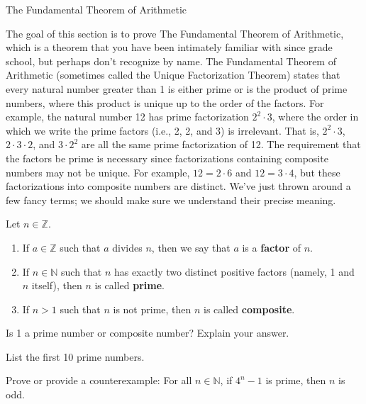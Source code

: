 \begin{section}{The Fundamental Theorem of Arithmetic}

The goal of this section is to prove The Fundamental Theorem of Arithmetic, which is a theorem that you have been intimately familiar with since grade school, but perhaps don't recognize by name.  The Fundamental Theorem of Arithmetic (sometimes called the Unique Factorization Theorem) states that every natural number greater than 1 is either prime or is the product of prime numbers, where this product is unique up to the order of the factors. For example, the natural number 12 has prime factorization $2^2\cdot 3$, where the order in which we write the prime factors (i.e., 2, 2, and 3) is irrelevant. That is, $2^2\cdot 3$, $2\cdot 3\cdot2$, and $3\cdot 2^2$ are all the same prime factorization of 12. The requirement that the factors be prime is necessary since factorizations containing composite numbers may not be unique. For example, $12=2\cdot 6$ and $12=3\cdot 4$, but these factorizations into composite numbers are distinct. We've just thrown around a few fancy terms; we should make sure we understand their precise meaning.

\begin{definition}
Let $n\in\mathbb{Z}$.
\begin{enumerate}[label=\textrm{(\alph*)}]
\item If $a\in \mathbb{Z}$ such that $a$ divides $n$, then we say that $a$ is a \textbf{factor} of $n$.
\item If $n\in \mathbb{N}$ such that $n$ has exactly two distinct positive factors (namely, 1 and $n$ itself), then $n$ is called \textbf{prime}.
\item If $n>1$ such that $n$ is not prime, then $n$ is called \textbf{composite}.
\end{enumerate}
\end{definition}

\begin{problem}
Is 1 a prime number or composite number?  Explain your answer.
\end{problem}

\begin{problem}
List the first 10 prime numbers.
\end{problem}

\begin{problem}
Prove or provide a counterexample:  For all $n\in\mathbb{N}$, if $4^n-1$ is prime, then $n$ is odd.
\end{problem}


\end{section}
